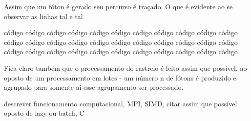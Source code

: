   Assim que um fóton é gerado seu percurso é traçado. O que é evidente ao se observar as linhas tal e tal

  código código código código código código código código código código código
  código código código código código código código código código código código
  código código código código código código código código código código código

  Fica claro também que o processamento do rastreio é feito assim que possível, ao oposto de um processamento em lotes - um número n de fótons é produzido e agrupado para somente aí esse agrupamento ser processado.

  descrever funcionamento computacional, MPI, SIMD, citar assim que possível oposto de lazy ou batch, C
